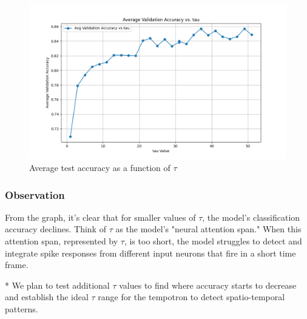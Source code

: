 \begin{figure}[H]
    \centering
    \includegraphics[width=0.8\linewidth]{results/graphs/tau-validation.png}
    \caption{Average test accuracy as a function of $\tau$}
    \label{fig:tau-validation}
\end{figure}


\subsubsection{Observation}

From the graph, it's clear that for smaller values of \( \tau \), the model's classification accuracy declines. Think of \( \tau \) as the model's "neural attention span." When this attention span, represented by \( \tau \), is too short, the model struggles to detect and integrate spike responses from different input neurons that fire in a short time frame.


* We plan to test additional \( \tau \) values to find where accuracy starts to decrease and establish the ideal \( \tau \) range for the tempotron to detect spatio-temporal patterns.

